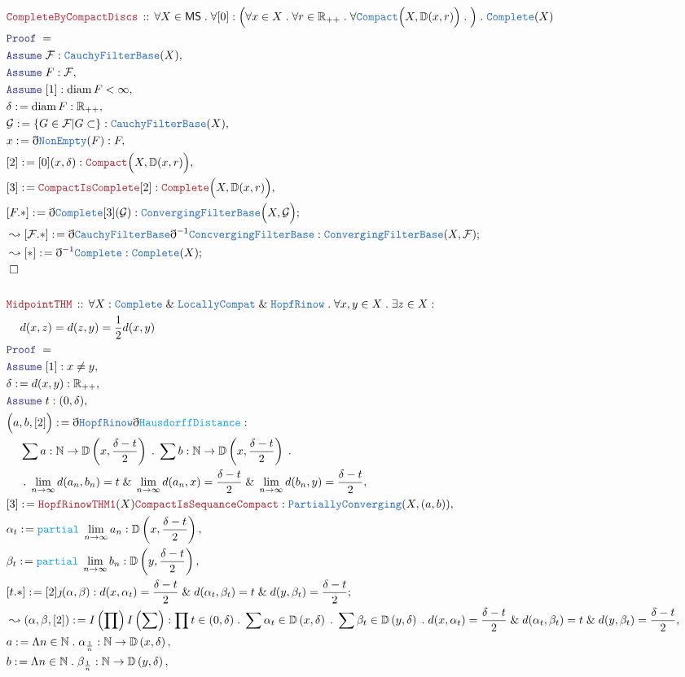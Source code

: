\documentclass[12pt]{scrartcl}
\newcommand{\TYPE}[1]{\textcolor{NavyBlue}{\mathtt{#1}}}
\newcommand{\FUNC}[1]{\textcolor{Cerulean}{\mathtt{#1}}}
\newcommand{\LOGIC}[1]{\textcolor{Blue}{\mathtt{#1}}}
\newcommand{\THM}[1]{\textcolor{Maroon}{\mathtt{#1}}}
\renewcommand{\.}{\; . \;}
\newcommand{\de}{: \kern 0.1pc =}
\newcommand{\Act}[1]{\left( #1 \right)}
\newcommand{\Theorem}[2]{& \THM{#1} \, :: \, #2 \\ & \Proof = \\ }
\newcommand{\NewLine}{\\ & \kern 1pc}
\newcommand{\Page}[1]{ \begin{align*} #1 \end{align*}   }
\newcommand{ \bd }{ \ByDef }
\renewcommand{\And}{\; \& \;}
\newcommand{\Reals}{\mathbb{R} }
\newcommand{\Nat}{\mathbb{N} }
\newcommand{\Say}[3]{& #1 \de #2 : #3, \\}
\newcommand{\Conclude}[3]{& #1 \de #2 : #3; \\}
\newcommand{\Derive}[3]{& \leadsto #1 \de #2 : #3, \\}
\newcommand{\DeriveConclude}[3]{& \leadsto #1 \de #2 : #3 ; \\}
\newcommand{\Assume}[2]{& \LOGIC{Assume} \; #1 : #2, \\}
\newcommand{\QED}{\; \square}
\newcommand{\EndProof}{& \QED \\}
\newcommand{\ByDef}{\eth}
\newcommand{\ByConstr}{\jmath}
\newcommand{\Proof}{\LOGIC{Proof} \; }
\newcommand{\F}{\mathcal{F}}
\DeclareMathOperator{\diam}{diam}
\newcommand{\MS}{\mathsf{MS}}
\begin{document}
\Page{
	\Theorem{CompleteByCompactDiscs}
	{
		\forall X \in \MS \.
		\forall [0] : \Big(     
			\forall  x \in X \.
			\forall  r \in \Reals_{++} \. 
			\forall  \TYPE{Compact}\Big( X ,\mathbb{D}(x,r) \Big) \.	
		\Big) \.
		\TYPE{Complete}(X)		
	}
	\Assume{\F}{\TYPE{CauchyFilterBase}(X)}
	\Assume{F}{\F}
	\Assume{[1]}{\diam F < \infty}
	\Say{\delta}{\diam F}{\Reals_{++}}
	\Say{\mathcal{G}}{\{ G \in \F  | G \subset  \}}{\TYPE{CauchyFilterBase}(X)}
	\Say{x}{\bd \TYPE{NonEmpty}(F)}{F}
	\Say{[2]}{[0](x,\delta)}{\THM{Compact}\Big(X,\mathbb{D}(x,r)\Big)}
	\Say{[3]}{\THM{CompactIsComplete}[2]}{\THM{Complete}\Big(X,\mathbb{D}(x,r)\Big)}
	\Conclude{[F.*]}{\bd \TYPE{Complete}[3](\mathcal{G})}{\TYPE{ConvergingFilterBase}\Big(X,\mathcal{G}\Big)}
	\DeriveConclude{[\F.*]}{\bd\TYPE{CauchyFilterBase}\bd^{-1}\TYPE{ConcvergingFilterBase}}
	{
		\TYPE{ConvergingFilterBase}(X,\F)
	}
	\DeriveConclude{[*]}{\bd^{-1} \TYPE{Complete}}{\TYPE{Complete}(X)}
	\EndProof
	\\
	\Theorem{MidpointTHM}{
		\forall X : \TYPE{Complete} \And \TYPE{LocallyCompat} \And \TYPE{HopfRinow} \. 
		\forall x,y \in X \.
		\exists z \in X : \NewLine
		d(x,z) = d(z,y) = \frac{1}{2} d(x,y)
	}
	\Assume{[1]}{x \neq y}
	\Say{\delta}{d(x,y)}{\Reals_{++}}
	\Assume{t}{(0,\delta)}
	\Say{\Big(a,b,[2]\Big)}{\bd \TYPE{HopfRinow}\bd \FUNC{HausdorffDistance}  }
	{
		\NewLine
		\sum a : \Nat \to \mathbb{D}\left(x,  \frac{\delta-t}{2} \right) \. 
		\sum b : \Nat \to \mathbb{D}\left(x,  \frac{\delta-t}{2} \right) \. \NewLine \.
		\lim_{n \to \infty} d(a_n,b_n) = t \And
		\lim_{n \to \infty} d(a_n,x) = \frac{\delta - t}{2} \And
		\lim_{n \to \infty} d(b_n,y) = \frac{\delta - t}{2} 
	}
	\Say{[3]}{\THM{HopfRinowTHM1}(X)\THM{CompactIsSequanceCompact}}
	{
	 	\TYPE{PartiallyConverging}(X,(a,b))
	}
	\Say{\alpha_t}{\FUNC{partial}\;\lim_{n \to \infty} a_n}{ \mathbb{D}\left(x,  \frac{\delta-t}{2} \right)}
	\Say{\beta_t}{\FUNC{partial}\;\lim_{n \to \infty} b_n}{ \mathbb{D}\left(y,  \frac{\delta-t}{2} \right)}
	\Conclude{[t.*]}{[2]\ByConstr (\alpha,\beta)}
	{ 
		d(x,\alpha_t) =   \frac{\delta - t}{2} \And
		d(\alpha_t,\beta_t) = t \And
		d(y,\beta_t) =   \frac{\delta - t}{2}
	}
	\Derive{(\alpha,\beta,[2])}{I\Act{\prod}I\Act{\sum}}
	{
		\prod t \in (0,\delta) \.
		\sum \alpha_t \in  \mathbb{D}\left(x,  \delta \right) \.
		\sum \beta_t \in  \mathbb{D}\left(y,  \delta \right) \. 
		d(x,\alpha_t) =   \frac{\delta - t}{2} \And
		d(\alpha_t,\beta_t) = t \And
		d(y,\beta_t) =   \frac{\delta - t}{2}
	}
	\Say{a}{\Lambda n \in \Nat \. \alpha_{\frac{1}{n}}}{\Nat \to \mathbb{D}\left(x,  \delta \right) }
	\Say{b}{\Lambda n \in \Nat \. \beta_{\frac{1}{n}}}{\Nat \to \mathbb{D}\left(y,  \delta \right) }
}
\end{document}
